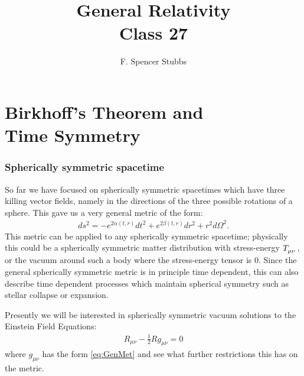 \documentclass[11pt,table]{article}
\title{{\Huge General Relativity}\\{\Large{Class 27}}} %
\author{F. Spencer Stubbs}
\begin{document}
    \maketitle
    \flushbottom
    \newpage
    \pagestyle{fancynotes}
    \part{Birkhoff's Theorem and\\ Time Symmetry}
    
        \section{Spherically symmetric spacetime}\label{sec:intro}
            So far we have focused on spherically symmetric spacetimes which have three killing vector fields, namely in the directions of the three possible rotations of a sphere.  This gave us a very general metric of the form:
            \begin{align}\label{eq:GenMet}
                ds^2 = -e^{2\alpha (t,r)}dt^2 + e^{2\beta (t,r)}dr^2 + r^2d\Omega^2.
            \end{align}
            This metric can be applied to any spherically symmetric spacetime; physically this could be a spherically symmetric matter distribution with stress-energy $\tensor{T}{_\mu_\nu}$, or the vacuum around such a body where the stress-energy tensor is 0.  Since the general spherically symmetric metric is in principle time dependent, this can also describe time dependent processes which maintain spherical symmetry such as stellar collapse or expansion.
            
            Presently we will be interested in spherically symmetric vacuum solutions to the Einstein Field Equations:
            \begin{align}\label{eq:VacEqn}
                R_{\mu\nu} - \frac{1}{2}Rg_{\mu\nu} = 0
            \end{align}
            where $g_{\mu\nu}$ has the form \eqref{eq:GenMet} and see what further restrictions this has on the metric.
            
\end{document}
